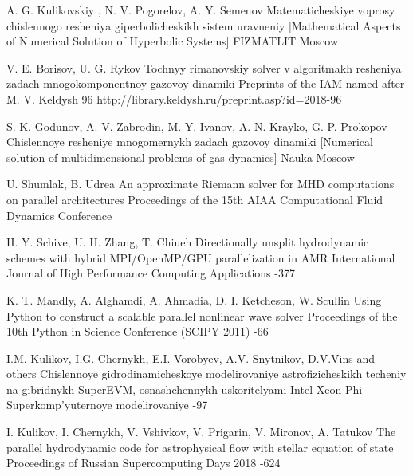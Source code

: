 \documentclass[utf8,english]{psta}%
\begin{document}
\begin{thebibliography}{30}

\by A. G. Kulikovskiy , N. V. Pogorelov, A. Y. Semenov
\book Matematicheskiye voprosy chislennogo resheniya giperbolicheskikh sistem uravneniy [Mathematical Aspects of Numerical Solution of Hyperbolic Systems]
\publ FIZMATLIT
\publaddr Moscow

\by V. E. Borisov, U. G. Rykov
\preprint Tochnyy rimanovskiy solver v algoritmakh resheniya zadach mnogokomponentnoy gazovoy dinamiki
\preprintinfo Preprints of the IAM named after M. V. Keldysh 96
\URL http://library.keldysh.ru/preprint.asp?id=2018-96

\by S. K. Godunov, A. V. Zabrodin, M. Y. Ivanov, A. N. Krayko, G. P. Prokopov
\book Chislennoye resheniye mnogomernykh zadach gazovoy dinamiki [Numerical solution of multidimensional problems of gas dynamics]
\publ Nauka
\publaddr Moscow

\by U. Shumlak, B. Udrea
\paper An approximate Riemann solver for MHD computations on parallel architectures
\jour Proceedings of the 15th AIAA Computational Fluid Dynamics Conference

\by H. Y. Schive, U. H. Zhang, T. Chiueh
\paper Directionally unsplit hydrodynamic schemes with hybrid MPI/OpenMP/GPU parallelization in AMR
\jour International Journal of High Performance Computing Applications
-377

\by K. T. Mandly, A. Alghamdi, A. Ahmadia, D. I. Ketcheson, W. Scullin
\paper Using Python to construct a scalable parallel nonlinear wave solver
\jour Proceedings of the 10th Python in Science Conference (SCIPY 2011)
-66

\by I.M. Kulikov, I.G. Chernykh, E.I. Vorobyev, A.V. Snytnikov, D.V.Vins and others
\paper Chislennoye gidrodinamicheskoye modelirovaniye astrofizicheskikh techeniy na gibridnykh SuperEVM, osnashchennykh uskoritelyami Intel Xeon Phi
\jour Superkomp'yuternoye modelirovaniye 
-97

\by I. Kulikov, I. Chernykh, V. Vshivkov, V. Prigarin, V. Mironov, A. Tatukov
\paper The parallel hydrodynamic code for astrophysical flow with stellar equation of state
\jour Proceedings of Russian Supercomputing Days 2018
-624


\end{thebibliography}
\end{document}
